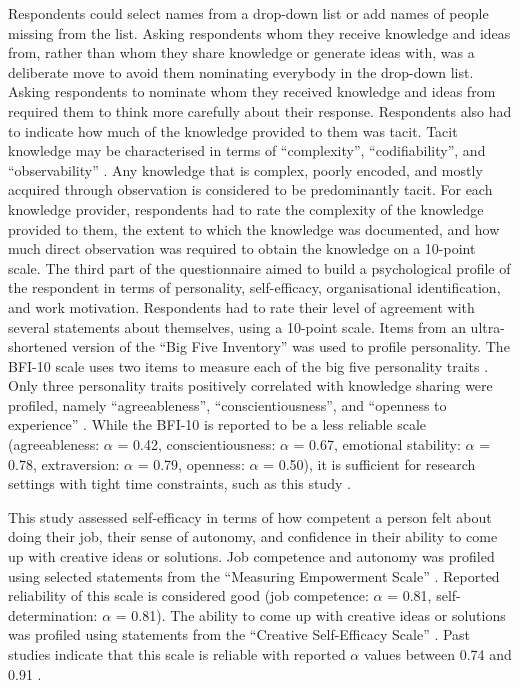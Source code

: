 Respondents could select names from a drop-down list or add names of people missing from the list. Asking respondents whom they receive knowledge and ideas from, rather than whom they share knowledge or generate ideas with, was a deliberate move to avoid them nominating everybody in the drop\hyp{}down list. Asking respondents to nominate whom they received knowledge and ideas from required them to think more carefully about their response. Respondents also had to indicate how much of the knowledge provided to them was tacit. Tacit knowledge may be characterised in terms of \enquote{complexity}, \enquote{codifiability}, and \enquote{observability} \citep{winter1987knowledge,zander1995knowledge,cavusgil2003tacit}. Any knowledge that is complex, poorly encoded, and mostly acquired through observation is considered to be predominantly tacit. For each knowledge provider, respondents had to rate the complexity of the knowledge provided to them, the extent to which the knowledge was documented, and how much direct observation was required to obtain the knowledge on a 10\hyp{}point scale. \medskip 
The third part of the questionnaire aimed to build a psychological profile of the respondent in terms of personality, self-efficacy, organisational identification, and work motivation. Respondents had to rate their level of agreement with several statements about themselves, using a 10-point scale. Items from an ultra-shortened version of the \enquote{Big Five Inventory} was used to profile personality. The BFI-10 scale uses two items to measure each of the big five personality traits \citep{rammstedt2007measuring}. Only three personality traits positively correlated with knowledge sharing were profiled, namely \enquote{agreeableness}, \enquote{conscientiousness}, and \enquote{openness to experience} \citep{matzler2008personality,matzler2011personality}. While the BFI-10 is reported to be a less reliable scale (agreeableness: $\alpha$ = 0.42, conscientiousness: $\alpha$ = 0.67, emotional stability: $\alpha$ = 0.78, extraversion: $\alpha$ = 0.79, openness: $\alpha$ = 0.50), it is sufficient for research settings with tight time constraints, such as this study \citep{rammstedt2007measuring}. \medskip

This study assessed self-efficacy in terms of how competent a person felt about doing their job, their sense of autonomy, and confidence in their ability to come up with creative ideas or solutions. Job competence and autonomy was profiled using selected statements from the \enquote{Measuring Empowerment Scale} \citep{spreitzer1995psychological}. Reported reliability of this scale is considered good (job competence: $\alpha$ = 0.81, self-determination: $\alpha$ = 0.81). The ability to come up with creative ideas or solutions was profiled using statements from the \enquote{Creative Self\hyp{}Efficacy Scale} \citep{tierney2002creative}. Past studies indicate that this scale is reliable with reported $\alpha$ values between 0.74 and 0.91 \citep{tierney2002creative,gong2009employee,tierney2011creative,mittal2015transformational}. \medskip

